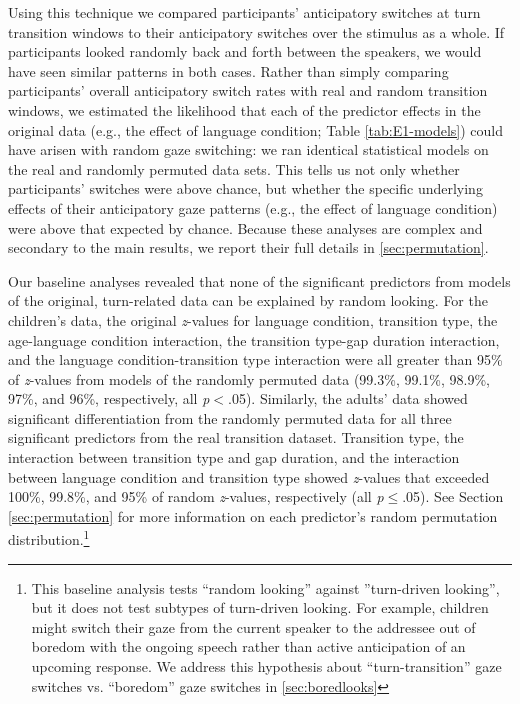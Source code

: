 \documentclass[authoryear, 12pt]{elsarticle}
\begin{document}
Using this technique we compared participants' anticipatory switches at turn transition windows to their anticipatory switches over the stimulus as a whole. If participants looked randomly back and forth between the speakers, we would have seen similar patterns in both cases. Rather than simply comparing participants' overall anticipatory switch rates with real and random transition windows, we estimated the likelihood that each of the predictor effects in the original data (e.g., the effect of language condition; Table \ref{tab:E1-models}) could have arisen with random gaze switching: we ran identical statistical models on the real and randomly permuted data sets. This tells us not only whether participants' switches were above chance, but whether the specific underlying effects of their anticipatory gaze patterns (e.g., the effect of language condition) were above that expected by chance. Because these analyses are complex and secondary to the main results, we report their full details in \ref{sec:permutation}.

Our baseline analyses revealed that none of the significant predictors from models of the original, turn-related data can be explained by random looking. For the children's data, the original \textit{z}-values for language condition, transition type, the age-language condition interaction, the transition type-gap duration interaction, and the language condition-transition type interaction were all greater than 95\% of \textit{z}-values from models of the randomly permuted data (99.3\%, 99.1\%, 98.9\%, 97\%, and 96\%, respectively, all \textit{p}$<$.05). Similarly, the adults' data showed significant differentiation from the randomly permuted data for all three significant predictors from the real transition dataset. Transition type, the interaction between transition type and gap duration, and the interaction between language condition and transition type showed \textit{z}-values that exceeded 100\%, 99.8\%, and 95\% of random \textit{z}-values, respectively (all \textit{p}$\leq$.05). See Section \ref{sec:permutation} for more information on each predictor's random permutation distribution.\footnote{This baseline analysis tests ``random looking'' against ''turn-driven looking'', but it does not test subtypes of turn-driven looking. For example, children might switch their gaze from the current speaker to the addressee out of boredom with the ongoing speech rather than active anticipation of an upcoming response. We address this hypothesis about ``turn-transition'' gaze switches vs. ``boredom'' gaze switches in \ref{sec:boredlooks}}
\end{document}
